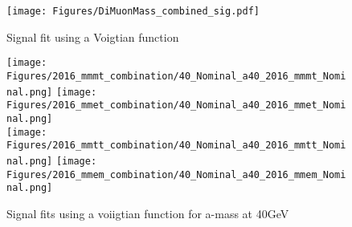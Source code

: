 \begin{figure}[ht!b]
    \centering 
    \texttt{[image: Figures/DiMuonMass\_combined\_sig.pdf]}
    \caption{\label{fig:fit_sig_all} Signal fit using a Voigtian function}
\end{figure}
\begin{figure}[ht!b]
  \centering
  \texttt{[image: Figures/2016\_mmmt\_combination/40\_Nominal\_a40\_2016\_mmmt\_Nominal.png]}
  \texttt{[image: Figures/2016\_mmet\_combination/40\_Nominal\_a40\_2016\_mmet\_Nominal.png]}\\
  \texttt{[image: Figures/2016\_mmtt\_combination/40\_Nominal\_a40\_2016\_mmtt\_Nominal.png]}
  \texttt{[image: Figures/2016\_mmem\_combination/40\_Nominal\_a40\_2016\_mmem\_Nominal.png]}\\
    \caption{\label{fig:fit_sig} Signal fits using a voiigtian function for a-mass at 40GeV }
\end{figure}

